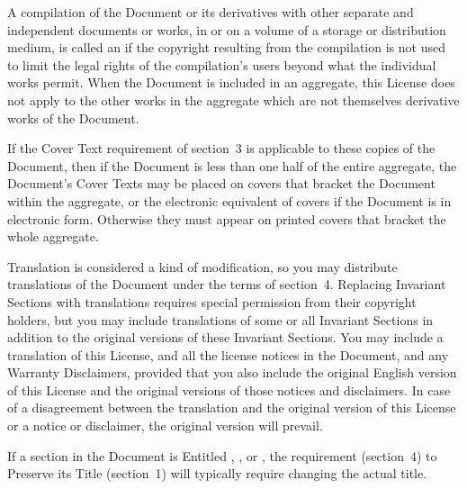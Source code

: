 \stopalignment


A compilation of the Document or its derivatives with other separate
and independent documents or works, in or on a volume of a storage or
distribution medium, is called an  if the copyright
resulting from the compilation is not used to limit the legal rights
of the compilation's users beyond what the individual works permit.
When the Document is included in an aggregate, this License does not
apply to the other works in the aggregate which are not themselves
derivative works of the Document.

If the Cover Text requirement of section~3 is applicable to these
copies of the Document, then if the Document is less than one half of
the entire aggregate, the Document's Cover Texts may be placed on
covers that bracket the Document within the aggregate, or the
electronic equivalent of covers if the Document is in electronic form.
Otherwise they must appear on printed covers that bracket the whole
aggregate.


\stopalignment


Translation is considered a kind of modification, so you may
distribute translations of the Document under the terms of section~4.
Replacing Invariant Sections with translations requires special
permission from their copyright holders, but you may include
translations of some or all Invariant Sections in addition to the
original versions of these Invariant Sections.  You may include a
translation of this License, and all the license notices in the
Document, and any Warranty Disclaimers, provided that you also include
the original English version of this License and the original versions
of those notices and disclaimers.  In case of a disagreement between
the translation and the original version of this License or a notice
or disclaimer, the original version will prevail.

If a section in the Document is Entitled ,
, or , the requirement (section~4) to Preserve
its Title (section~1) will typically require changing the actual
title.


\stopalignment


